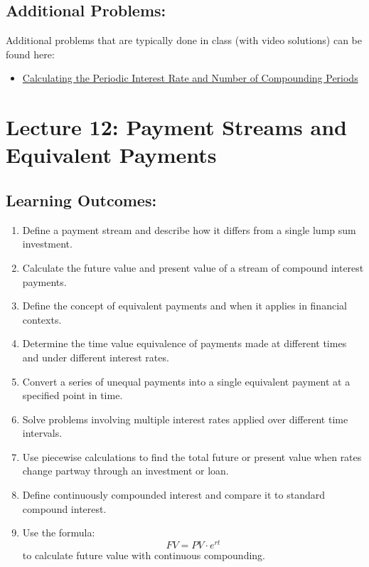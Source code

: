 \documentclass[
]{book}
\providecommand{\tightlist}{%
  \setlength{\itemsep}{0pt}\setlength{\parskip}{0pt}}
\begin{document}
\subsection*{Additional Problems:}\label{additional-problems-10}

Additional problems that are typically done in class (with video solutions) can be found here:

\begin{itemize}
\tightlist
\item
  \href{https://theelementsmath.github.io/M114/compound-interest.html\#calculating-the-periodic-interest-rate-and-number-of-compounding-periods}{Calculating the Periodic Interest Rate and Number of Compounding Periods}
\end{itemize}

\section*{Lecture 12: Payment Streams and Equivalent Payments}\label{lecture-12-payment-streams-and-equivalent-payments}

\subsection*{Learning Outcomes:}\label{learning-outcomes-11}

\begin{enumerate}
\def\labelenumi{\arabic{enumi}.}
\tightlist
\item
  Define a payment stream and describe how it differs from a single lump sum investment.
\item
  Calculate the future value and present value of a stream of compound interest payments.
\item
  Define the concept of equivalent payments and when it applies in financial contexts.
\item
  Determine the time value equivalence of payments made at different times and under different interest rates.
\item
  Convert a series of unequal payments into a single equivalent payment at a specified point in time.
\item
  Solve problems involving multiple interest rates applied over different time intervals.
\item
  Use piecewise calculations to find the total future or present value when rates change partway through an investment or loan.
\item
  Define continuously compounded interest and compare it to standard compound interest.
\item
  Use the formula:
  \[
   FV = PV \cdot e^{rt}
   \]
  to calculate future value with continuous compounding.
\end{enumerate}
\end{document}
